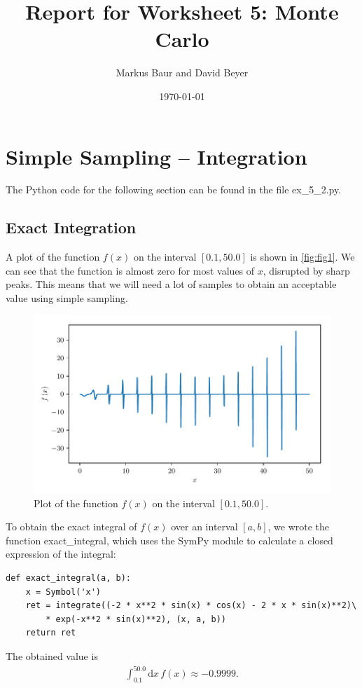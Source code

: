 \documentclass[a4paper,10pt,bibtotoc]{scrartcl}
\begin{document}
\titlehead{Simulation Methods in Physics I \hfill WS 2019/2010}
\title{Report for Worksheet 5: Monte Carlo}
\author{Markus Baur and David Beyer}
\date{\today}
\maketitle

\tableofcontents
\section{Simple Sampling -- Integration}
The Python code for the following section can be found in the file ex\_5\_2.py.
\subsection{Exact Integration}
A plot of the function $f(x)$ on the interval $\left[0.1,50.0\right]$ is shown in \autoref{fig:fig1}. 
We can see that the function is almost zero for most values of $x$, disrupted by sharp peaks.
This means that we will need a lot of samples to obtain an acceptable value using simple sampling.
\begin{figure}
	\centering
	\includegraphics[width=\linewidth]{plotf.pdf}
	\caption{Plot of the function $f(x)$ on the interval $\left[0.1,50.0\right]$.}
	\label{fig:fig1}
\end{figure}

To obtain the exact integral of $f(x)$ over an interval $\left[a, b\right]$, we wrote the function exact\_integral, which uses the SymPy module to calculate a closed expression of the integral:
\begin{lstlisting}
def exact_integral(a, b):
    x = Symbol('x')
    ret = integrate((-2 * x**2 * sin(x) * cos(x) - 2 * x * sin(x)**2)\
        * exp(-x**2 * sin(x)**2), (x, a, b))
    return ret
\end{lstlisting}
The obtained value is
\begin{align}
\int_{0.1}^{50.0}\mathrm{d}x\,f(x)\approx -0.9999.
\end{align}
\end{document}
